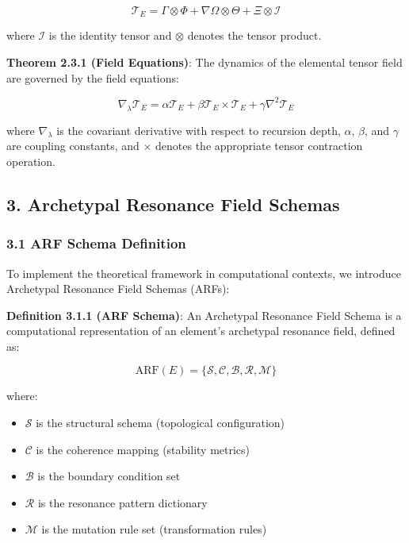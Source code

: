 \documentclass[
]{article}
\providecommand{\tightlist}{%
  \setlength{\itemsep}{0pt}\setlength{\parskip}{0pt}}
\begin{document}
\[\mathcal{T}_E = \Gamma \otimes \Phi + \nabla \Omega \otimes \Theta + \Xi \otimes \mathcal{I}\]

where \(\mathcal{I}\) is the identity tensor and \(\otimes\) denotes the
tensor product.

\textbf{Theorem 2.3.1 (Field Equations)}: The dynamics of the elemental
tensor field are governed by the field equations:

\[\nabla_\lambda \mathcal{T}_E = \alpha \mathcal{T}_E + \beta \mathcal{T}_E \times \mathcal{T}_E + \gamma \nabla^2 \mathcal{T}_E\]

where \(\nabla_\lambda\) is the covariant derivative with respect to
recursion depth, \(\alpha\), \(\beta\), and \(\gamma\) are coupling
constants, and \(\times\) denotes the appropriate tensor contraction
operation.

\subsection{3. Archetypal Resonance Field
Schemas}\label{archetypal-resonance-field-schemas}

\subsubsection{3.1 ARF Schema Definition}\label{arf-schema-definition}

To implement the theoretical framework in computational contexts, we
introduce Archetypal Resonance Field Schemas (ARFs):

\textbf{Definition 3.1.1 (ARF Schema)}: An Archetypal Resonance Field
Schema is a computational representation of an element's archetypal
resonance field, defined as:

\[\text{ARF}(E) = \{\mathcal{S}, \mathcal{C}, \mathcal{B}, \mathcal{R}, \mathcal{M}\}\]

where:

\begin{itemize}
\tightlist
\item
  \(\mathcal{S}\) is the structural schema (topological configuration)
\item
  \(\mathcal{C}\) is the coherence mapping (stability metrics)
\item
  \(\mathcal{B}\) is the boundary condition set
\item
  \(\mathcal{R}\) is the resonance pattern dictionary
\item
  \(\mathcal{M}\) is the mutation rule set (transformation rules)
\end{itemize}
\end{document}
